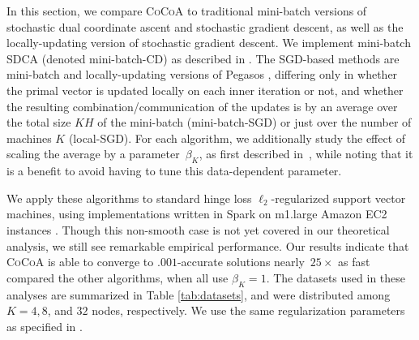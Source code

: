 \documentclass{article} %
\newcommand{\algname}{\textsc{CoCoA}\xspace}  %
\begin{document}
In this section, we compare \algname to traditional mini-batch versions of
stochastic dual coordinate ascent and stochastic gradient descent, as well as
the locally-updating version of stochastic gradient descent. We implement
mini-batch SDCA (denoted mini-batch-CD) as described in
\cite{Takac:2013ut,Yang:2013vl}. The SGD-based methods are mini-batch and
locally-updating versions of Pegasos \cite{ShalevShwartz:2010cg}, differing
only in whether the primal vector is updated locally on each inner iteration
or not, and whether the resulting combination/communication of the updates is
by an average over the total size $KH$ of the mini-batch (mini-batch-SGD) or
just over the number of machines $K$ (local-SGD). 
For each algorithm, we additionally study the effect of scaling the
average by a parameter~$\beta_K$, as first described in~\cite{Takac:2013ut},
while noting that it is a benefit to avoid having to tune this data-dependent
parameter.

We apply these algorithms to standard hinge loss $\ell_2$-regularized 
support vector machines, using implementations written in
\textsf{\small Spark} on m1.large Amazon EC2 instances \cite{Zaharia:2012ve}.
Though this non-smooth case is not yet covered in our theoretical analysis,
we still see remarkable empirical performance. Our results 
indicate that \algname is able to converge to $.001$-accurate solutions
nearly~$25\times$ as fast compared the other algorithms, when all use 
$\beta_K=1$. 
The datasets used in these analyses are summarized in Table 
\ref{tab:datasets}, and were
distributed among $K= 4, 8$, and $32$ nodes, respectively. We use the same 
regularization parameters as specified in
\cite{ShalevShwartz:2010cg,Hsieh:2008bd}.
\end{document}
